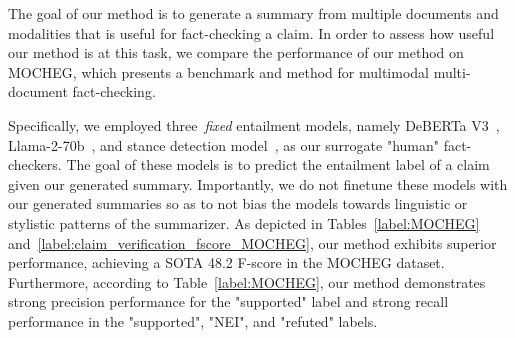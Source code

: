 The goal of our method is to generate a summary from multiple documents and modalities that is useful for fact-checking a claim. In order to assess how useful our method is at this task, we compare the performance of our method on MOCHEG, which presents a benchmark and method for multimodal multi-document fact-checking.

Specifically, we employed three~\textit{fixed} entailment models, namely DeBERTa V3~\cite{he2023debertav3}, Llama-2-70b~\cite{touvron2023llama}, and stance detection model~\cite{Yao_2023}, as our surrogate "human" fact-checkers. The goal of these models is to predict the entailment label of a claim given our generated summary. Importantly, we do not finetune these models with our generated summaries so as to not bias the models towards linguistic or stylistic patterns of the summarizer. As depicted in Tables~\ref{label:MOCHEG} and~\ref{label:claim_verification_fscore_MOCHEG}, our method exhibits superior performance, achieving a SOTA 48.2 F-score in the MOCHEG dataset. Furthermore, according to Table~\ref{label:MOCHEG}, our method demonstrates strong precision performance for the "supported" label and strong recall performance in the "supported", "NEI", and "refuted" labels.


